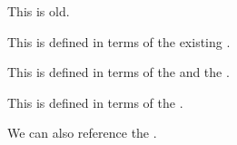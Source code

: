 \documentclass[minimal]{omdoc}
\begin{document}
\begin{module}[id=foo]
  \begin{definition}[id=test.one]
    This  is old.
  \end{definition}

  \begin{definition}
    This  is defined in terms of the existing .
  \end{definition}

  \begin{definition}
    This  is defined in terms of the  and the 
    . 
  \end{definition}

  \begin{definition}
    This  is defined in terms of the
    .
  \end{definition}
  We can also reference the .
\end{module}
\end{document}
